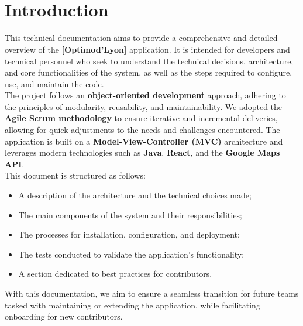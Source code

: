 \documentclass[a4paper]{article}
\begin{document}
\newcommand{\HRule}{\rule{\linewidth}{0.5mm}}



~
\thispagestyle{empty}

\tableofcontents
\thispagestyle{empty}
\setcounter{page}{0}

\renewcommand{\arraystretch}{1.5}


~
\thispagestyle{empty}
\setcounter{page}{0}

\section*{Introduction}

This technical documentation aims to provide a comprehensive and detailed overview of the \textbf{[Optimod'Lyon]} application. It is intended for developers and technical personnel who seek to understand the technical decisions, architecture, and core functionalities of the system, as well as the steps required to configure, use, and maintain the code. \\
\newline
\noindent
The project follows an \textbf{object-oriented development} approach, adhering to the principles of modularity, reusability, and maintainability. We adopted the \textbf{Agile Scrum methodology} to ensure iterative and incremental deliveries, allowing for quick adjustments to the needs and challenges encountered. The application is built on a \textbf{Model-View-Controller (MVC)} architecture and leverages modern technologies such as \textbf{Java}, \textbf{React}, and the \textbf{Google Maps API}.\\
\newline
\noindent
This document is structured as follows:
\begin{itemize}
    \item A description of the architecture and the technical choices made;
    \item The main components of the system and their responsibilities;
    \item The processes for installation, configuration, and deployment;
    \item The tests conducted to validate the application’s functionality;
    \item A section dedicated to best practices for contributors.
\end{itemize}
\noindent
With this documentation, we aim to ensure a seamless transition for future teams tasked with maintaining or extending the application, while facilitating onboarding for new contributors.
\end{document}
